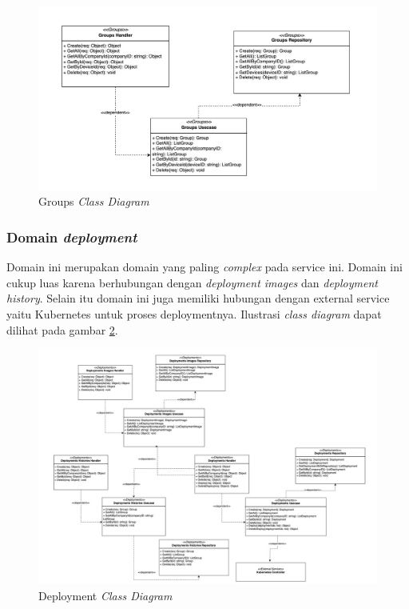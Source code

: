 \begin{figure}[ht]
  \centering
  \includegraphics[width=1\textwidth]{resources/chapter-3/class/groups-class-diagram.jpg}
  \caption{Groups \textit{Class Diagram}}
  \label{fig:groups-class-diagram}
\end{figure}

\subsubsection{Domain \textit{deployment}}

Domain ini merupakan domain yang paling \textit{complex} pada service ini. Domain ini cukup luas karena berhubungan dengan \textit{deployment images} dan \textit{deployment history}. Selain itu domain ini juga memiliki hubungan dengan external service yaitu Kubernetes untuk proses deploymentnya. Ilustrasi \textit{class diagram} dapat dilihat pada gambar \ref{fig:deployment-class-diagram}.

\begin{figure}[ht]
  \centering
  \includegraphics[width=1\textwidth]{resources/chapter-3/class/deployment-class-diagram.jpg}
  \caption{Deployment \textit{Class Diagram}}
  \label{fig:deployment-class-diagram}
\end{figure}

